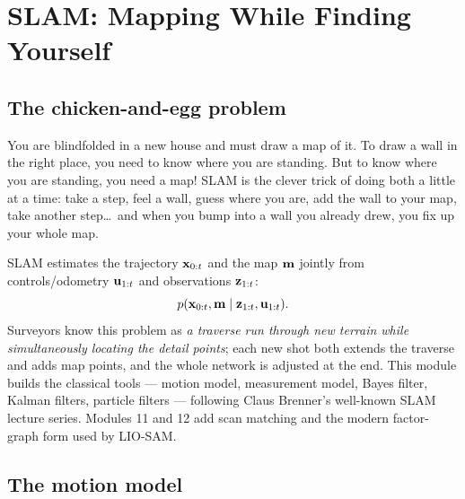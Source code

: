 \chapter{SLAM: Mapping While Finding Yourself}

\section{The chicken-and-egg problem}
\begin{kid}
You are blindfolded in a new house and must draw a map of it. To draw a wall in the right place, you need to know where you are standing. But to know where you are standing, you need a map! SLAM is the clever trick of doing both a little at a time: take a step, feel a wall, guess where you are, add the wall to your map, take another step\ldots\ and when you bump into a wall you already drew, you fix up your whole map.
\end{kid}


\begin{eng}
SLAM estimates the trajectory $\mathbf{x}_{0:t}$ and the map $\mathbf{m}$ jointly from controls/odometry $\mathbf{u}_{1:t}$ and observations $\mathbf{z}_{1:t}$:
\[ p(\mathbf{x}_{0:t},\mathbf{m}\mid\mathbf{z}_{1:t},\mathbf{u}_{1:t}). \]
Surveyors know this problem as \emph{a traverse run through new terrain while simultaneously locating the detail points}; each new shot both extends the traverse and adds map points, and the whole network is adjusted at the end. This module builds the classical tools --- motion model, measurement model, Bayes filter, Kalman filters, particle filters --- following Claus Brenner's well-known SLAM lecture series. Modules 11 and 12 add scan matching and the modern factor-graph form used by LIO-SAM.
\end{eng}

\section{The motion model}

